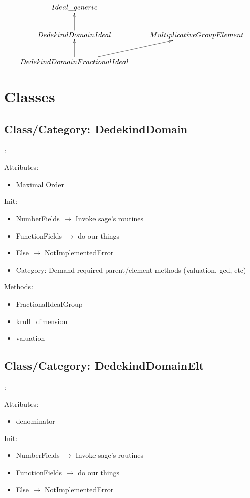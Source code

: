 \documentclass{amsart}
\theoremstyle{definition}
\begin{document}
	\[
		\xymatrix{
			Ideal\_generic \\
			DedekindDomainIdeal \ar[u] & MultiplicativeGroupElement \\
			DedekindDomainFractionalIdeal \ar[ur] \ar[u]
		}
	\]
	
	\section{Classes}

	\subsection{Class/Category: DedekindDomain}: \newline
		
		Attributes:
		\begin{itemize}
			\item 
			Maximal Order
		\end{itemize}
	
		Init:
		\begin{itemize}
			\item
			NumberFields $\rightarrow$ Invoke sage's routines
			\item
			FunctionFields $\rightarrow$ do our things
			\item
			Else $\rightarrow$ NotImplementedError
			\item
			Category: Demand required parent/element methods (valuation, gcd, etc)
		\end{itemize}
	
		Methods:
		\begin{itemize}
			\item 
			FractionalIdealGroup
			\item
			krull\_dimension
			\item
			valuation
		\end{itemize}

	\subsection{Class/Category: DedekindDomainElt}: \newline
	
	Attributes:
	\begin{itemize}
		\item 
		denominator
	\end{itemize}
	
	Init:
	\begin{itemize}
		\item
		NumberFields $\rightarrow$ Invoke sage's routines
		\item
		FunctionFields $\rightarrow$ do our things
		\item
		Else $\rightarrow$ NotImplementedError
	\end{itemize}
	
\end{document}
